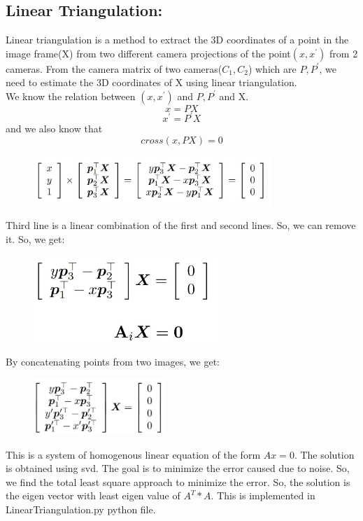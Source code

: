 \documentclass[12pt]{article}
\begin{document}
\subsection{Linear Triangulation:}
Linear triangulation is a method to extract the 3D coordinates of a point in the image frame(X) from two different camera projections of the point$(x,x^{'})$ from 2 cameras.  From the camera matrix of two cameras($C_1, C_2$) which are $P,P^{'}$, we need to estimate the 3D coordinates of X using linear triangulation. \\
We know the relation between $(x,x^{'})$ and $P,P^{'}$ and X.
\begin{equation}
	x = PX
\end{equation}
\begin{equation}
	x^{'} = P^{'}X
\end{equation}
and we also know that
\begin{equation}
	cross(x, PX)= 0 
\end{equation}
\newpage
\begin{figure}[h]
    \centering
    \includegraphics[width=9cm]{formula}
\end{figure}
Third line is a linear combination of the first and second lines.  So, we can remove it. So, we get:
\begin{figure}[h]
    \centering
    \includegraphics[width=7cm]{formula1}
\end{figure}
By concatenating points from two images, we get:
\begin{figure}[h]
    \centering
    \includegraphics[width=5cm]{formula2}
\end{figure}
This is a system of homogenous linear equation of the form $Ax = 0$. The solution is obtained using svd. The goal is to minimize the error caused due to noise. So, we find the total least square approach to minimize the error. So, the solution is the eigen vector with least eigen value of $A^{T}*A$. This is implemented in LinearTriangulation.py python file.
\end{document}
